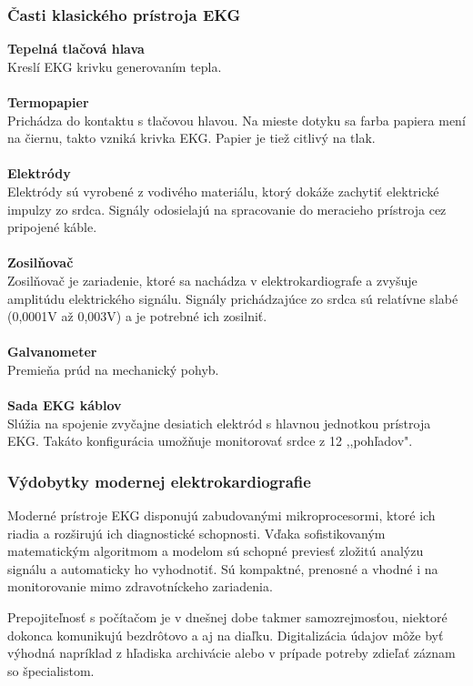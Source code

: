 \documentclass[titlepage,12pt]{article}
\begin{document}
\newpage


\subsubsection{Časti klasického prístroja EKG}

\textbf{Tepelná tlačová hlava}
\\
Kreslí EKG krivku generovaním tepla.
\\
\\
\textbf{Termopapier}
\\
Prichádza do kontaktu s tlačovou hlavou. Na mieste dotyku sa farba papiera mení na čiernu, takto vzniká krivka EKG. Papier je tiež citlivý na tlak.
\\
\\
\textbf{Elektródy}
\\
Elektródy sú vyrobené z vodivého materiálu, ktorý dokáže zachytiť elektrické impulzy zo srdca. Signály odosielajú na spracovanie do meracieho prístroja cez pripojené káble.
\\
\\
\textbf{Zosilňovač}
\\
Zosilňovač je zariadenie, ktoré sa nachádza v elektrokardiografe a zvyšuje amplitúdu elektrického signálu. Signály prichádzajúce zo srdca sú relatívne slabé (0,0001V až 0,003V) a je potrebné ich zosilniť.
\\
\\
\textbf{Galvanometer}
\\
Premieňa prúd na mechanický pohyb.
\\
\\
\textbf{Sada EKG káblov}
\\
Slúžia na spojenie zvyčajne desiatich elektród s hlavnou jednotkou prístroja EKG. Takáto konfigurácia umožňuje monitorovať srdce z 12 ,,pohľadov".

\subsubsection{Výdobytky modernej elektrokardiografie}
Moderné prístroje EKG disponujú zabudovanými mikroprocesormi, ktoré ich riadia a rozširujú ich diagnostické schopnosti. Vďaka sofistikovaným matematickým algoritmom a modelom sú schopné previesť zložitú analýzu signálu a automaticky ho vyhodnotiť. Sú kompaktné, prenosné a vhodné i na monitorovanie mimo zdravotníckeho zariadenia.

Prepojiteľnosť s počítačom je v dnešnej dobe takmer samozrejmosťou, niektoré dokonca komunikujú bezdrôtovo a aj na diaľku. Digitalizácia údajov môže byť výhodná napríklad z hľadiska archivácie alebo v prípade potreby zdieľať záznam so špecialistom.
\end{document}
